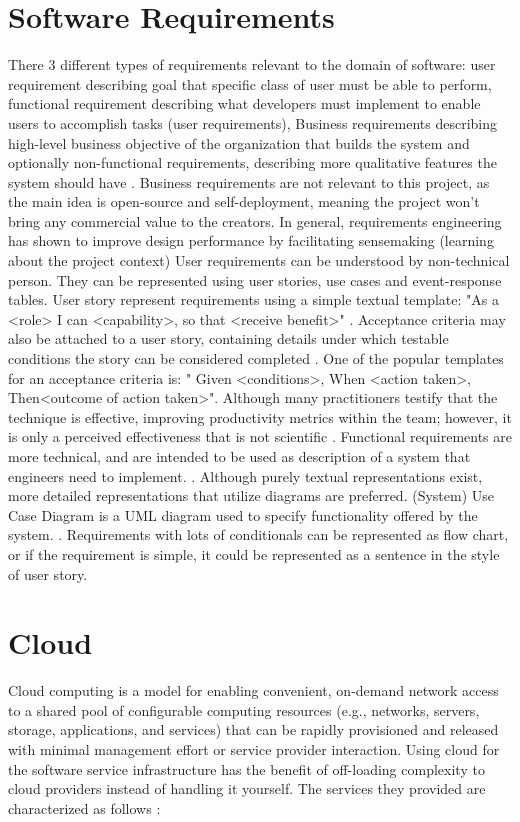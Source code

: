 \section{Software Requirements}
There 3 different types of requirements relevant to the domain of software: user requirement describing goal that specific class of user must be able to perform, functional requirement describing what developers must implement to enable users to accomplish tasks (user requirements), Business requirements describing high-level business objective of the organization that builds the system and optionally non-functional requirements, describing more qualitative features the system should have \cite{wiegers2013software}. Business requirements are not relevant to this project, as the main idea is open-source and self-deployment, meaning the project won't bring any commercial value to the creators. 
In general, requirements engineering has shown to improve design performance by facilitating sensemaking (learning about the project context)
User requirements can be understood by non-technical person. They can be represented using user stories, use cases and event-response tables. User story represent requirements using a simple textual template: "As a <role> I can <capability>, so that <receive benefit>" \cite{userStories}. Acceptance criteria may also be attached to a user story, containing details under which testable conditions the story can be considered completed \cite{Kannan2019User}. One of the popular templates for an acceptance criteria is: " Given <conditions>, When <action taken>, Then<outcome of action taken>". Although many practitioners testify that the technique is effective, improving productivity metrics within the team; however, it is only a perceived effectiveness that is not scientific \cite{userStories}.
Functional requirements are more technical, and are intended to be used as description of a system that engineers need to implement. \cite{wiegers2013software}. Although purely textual representations exist, more detailed representations that utilize diagrams are preferred. (System) Use Case Diagram is a UML diagram used to specify functionality offered by the system. \cite{malan2001functional}. Requirements with lots of conditionals can be represented as flow chart, or if the requirement is simple, it could be represented as a sentence in the style of user story. 

\section{Cloud}
Cloud computing is a model for enabling convenient, on-demand network access to a shared pool of configurable computing
resources (e.g., networks, servers, storage, applications, and services) that can be rapidly provisioned and released with minimal
management effort or service provider interaction. \cite {cloudDef}
Using cloud for the software service infrastructure has the benefit of off-loading complexity to cloud providers instead of handling it yourself. The services they provided are characterized as follows \cite{cloudServicesCategories}: 
